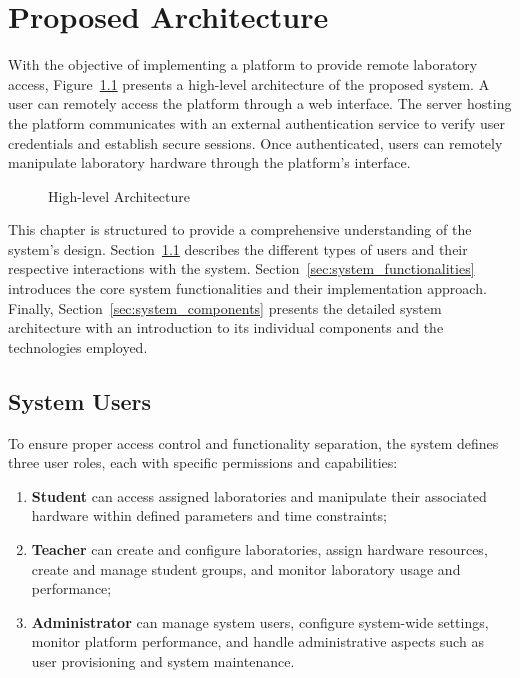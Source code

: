 %
%
\chapter{Proposed Architecture}\label{cap:proposed-architecture}
\let\cleardoublepage\clearpage

With the objective of implementing a platform to provide remote laboratory access, Figure~\ref{fig:architecture} presents a high-level architecture of the proposed system. A user can remotely access the platform through a web interface. The server hosting the platform communicates with an external authentication service to verify user credentials and establish secure sessions. Once authenticated, users can remotely manipulate laboratory hardware through the platform's interface.

\vspace{5mm}

\begin{figure}[H]
    \centering
    
\caption{High-level Architecture}
\label{fig:architecture}
\end{figure}

This chapter is structured to provide a comprehensive understanding of the system's design. Section~\ref{sec:user_role} describes the different types of users and their respective interactions with the system. Section~\ref{sec:system_functionalities} introduces the core system functionalities and their implementation approach. Finally, Section~\ref{sec:system_components} presents the detailed system architecture with an introduction to its individual components and the technologies employed.

\section{System Users}\label{sec:user_role}
To ensure proper access control and functionality separation, the system defines three user roles, each with specific permissions and capabilities:

\begin{enumerate}[label=\roman*.]
    \item \textbf{Student} can access assigned laboratories and manipulate their associated hardware within defined parameters and time constraints;
    \item \textbf{Teacher} can create and configure laboratories, assign hardware resources, create and manage student groups, and monitor laboratory usage and performance;
    \item \textbf{Administrator} can manage system users, configure system-wide settings, monitor platform performance, and handle administrative aspects such as user provisioning and system maintenance.
\end{enumerate}

